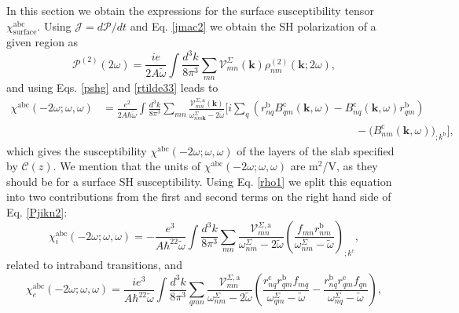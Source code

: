 In this section we obtain the expressions for the surface susceptibility tensor
$\chi^{\mathrm{abc}}_{\mathrm{surface}}$. Using
$\boldsymbol{\mathcal{J}}=d\boldsymbol{\mathcal{P}}/dt$ and Eq. \eqref{jmac2} we
obtain the SH polarization of a given region as
\begin{equation}\label{Pjikn}
\boldsymbol{\mathcal{P}}^{(2)}(2\omega)
= \frac{ie}{2A\tilde\omega} \int \frac{d^3 k}{8\pi^3}
\sum_{mn} \boldsymbol{\mathcal{V}}^{\Sigma}_{mn}(\mathbf{k})
\rho^{(2)}_{nm}(\mathbf{k};2\omega),
\end{equation}
and using Eqs. \eqref{pshg} and \eqref{rtilde33} leads to
\begin{align}\label{Pjikn2}
\chi^{\mathrm{a}\mathrm{b}\mathrm{c}}(-2\omega;\omega,\omega) 
&= \frac{e^2}{2A\hbar\tilde\omega}
\int \frac{d^3 k}{8\pi^3}
\sum_{mn}
\frac{\boldsymbol{\mathcal{V}}^{\Sigma,\mathrm{a}}_{mn}(\mathbf{k})}
{\omega^\Sigma_{nm\mathbf{k}}-2\tilde\omega}
\bigg[
i\sum_q\left(r_{nq}^{\mathrm{b}}B_{qm}^{\mathrm{c}}(\mathbf{k},\omega) -
  B_{nq}^{\mathrm{c}}(\mathbf{k},\omega) 
  r_{qm}^{\mathrm{b}}\right)\nonumber\\
&\qquad\qquad\qquad\qquad\qquad\qquad\qquad\qquad\qquad\qquad\qquad\quad
-\Big(B_{nm}^{\mathrm{c}}(\mathbf{k},\omega)\Big)_{;k^{\mathrm{b}}}
\bigg],
\end{align}
which gives the susceptibility
$\chi^{\mathrm{a}\mathrm{b}\mathrm{c}}(-2\omega;\omega,\omega)$ of the layers of
the slab specified by $\boldsymbol{\mathcal{C}}(z)$. We mention that the units
of $\chi^{\mathrm{a}\mathrm{b}\mathrm{c}}(-2\omega;\omega,\omega)$ are m$^2$/V,
as they should be for a surface SH susceptibility. Using Eq. \eqref{rho1} we
split this equation into two contributions from the first and second terms on
the right hand side of Eq. \eqref{Pjikn2}:
\begin{equation}
\chi^{\mathrm{a}\mathrm{b}\mathrm{c}}_i (-2\omega;\omega,\omega)
=-\frac{e^3}{A\hbar^22\tilde\omega}
\int \frac{d^3 k}{8\pi^3}
\sum_{mn}
\frac{\boldsymbol{\mathcal{V}}_{mn}^{\Sigma,\mathrm{a}}}{\omega^\Sigma_{nm}-2\tilde\omega}
\left(\frac{f_{mn}r_{nm}^{\mathrm{b}}}{\omega^\Sigma_{nm}-\tilde\omega}\right)_{;k^{\mathrm{c}}}
,
\label{chii}
\end{equation} 
related to intraband transitions, and 
\begin{equation}
\chi^{\mathrm{a}\mathrm{b}\mathrm{c}}_e (-2\omega;\omega,\omega)
=\frac{ie^3}{A\hbar^22\tilde\omega}
\int \frac{d^3 k}{8\pi^3}
\sum_{qmn}
\frac{\boldsymbol{\mathcal{V}}_{mn}^{\Sigma,\mathrm{a}}}{\omega^\Sigma_{nm}-2\tilde\omega}
\left(
\frac{r_{nq}^{\mathrm{c}} r_{qm}^{\mathrm{b}} 
f_{mq}}{\omega^\Sigma_{qm}-\tilde\omega}
-\frac{r_{nq}^{\mathrm{b}} r_{qm}^{\mathrm{c}} 
f_{qn}}{\omega^\Sigma_{nq}-\tilde\omega}
\right),
\label{chie}
\end{equation} 
